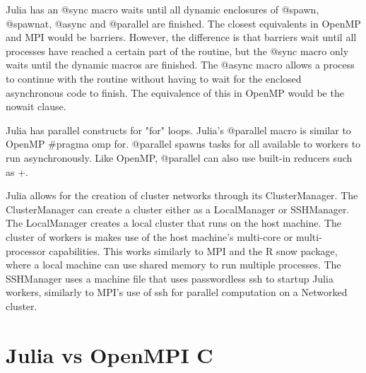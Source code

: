 \documentclass[12pt]{article}
\begin{document}
Julia has an @sync macro waits until all dynamic enclosures of @spawn, @spawnat, @async and @parallel are finished\cite{juliadocs}. The closest equivalents in OpenMP and MPI would be barriers. However, the difference is that barriers wait until all processes have reached a certain part of the routine, but the @sync macro only waits until the dynamic macros are finished. The @async macro allows a process to continue with the routine without having to wait for the enclosed asynchronous code to finish\cite{juliadocs}. The equivalence of this in OpenMP would be the nowait clause.

Julia has parallel constructs for "for" loops. Julia's @parallel macro is similar to OpenMP \#pragma omp for. @parallel spawns tasks for all available to workers to run asynchronously\cite{juliadocs}. Like OpenMP, @parallel can also use built-in reducers such as +. 

Julia allows for the creation of cluster networks through its ClusterManager. The ClusterManager can create a cluster either as a LocalManager or SSHManager. The LocalManager creates a local cluster that runs on the host machine. The cluster of workers is makes use of the host machine’s multi-core or multi-processor capabilities\cite{juliadocs}. This works similarly to MPI and the R snow package, where a local machine can use shared memory to run multiple processes. The SSHManager uses a machine file that uses passwordless ssh to startup Julia workers, similarly to MPI's use of ssh for parallel computation on a Networked cluster\cite{juliadocs}.
\pagebreak
\section{Julia vs OpenMPI C}
\end{document}

